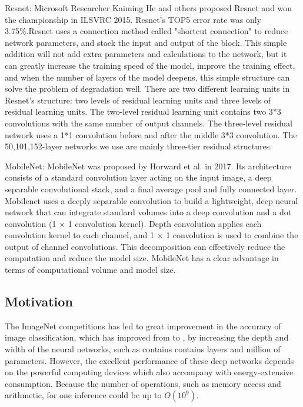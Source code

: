 Resnet: Microsoft Researcher Kaiming He and others proposed Resnet and won the championship in ILSVRC 2015. Resnet's TOP5 error rate was only 3.75\%.Resnet uses a connection method called "shortcut connection" to reduce network parameters, and stack the input and output of the block. This simple addition will not add extra parameters and calculations to the network, but it can greatly increase the training speed of the model, improve the training effect, and when the number of layers of the model deepens, this simple structure can solve the problem of degradation well. There are two different learning units in Resnet's structure: two levels of residual learning units and three levels of residual learning units. The two-level residual learning unit contains two 3*3 convolutions with the same number of output channels. The three-level residual network uses a 1*1 convolution before and after the middle 3*3 convolution. The 50,101,152-layer networks we use are mainly three-tier residual structures.


MobileNet: MobileNet was proposed by Horward et al. in 2017. Its architecture consists of a standard convolution layer acting on the input image, a deep separable convolutional stack, and a final average pool and fully connected layer. Mobilenet uses a deeply separable convolution to build a lightweight, deep neural network that can integrate standard volumes into a deep convolution and a dot convolution (1 × 1 convolution kernel). Depth convolution applies each convolution kernel to each channel, and 1 × 1 convolution is used to combine the output of channel convolutions. This decomposition can effectively reduce the computation and reduce the model size. MobileNet has a clear advantage in terms of computational volume and model size.

\subsection{Motivation}
The ImageNet\FIXME{\cite{}} competitions has led to great improvement 
in the accuracy of image classification,
which has improved from \FIXME{\cite{}} to \FIXME{\cite{}},
by increasing the depth and width of the neural networks,
such as  contains contains  layers and
 million of parameters.
However, the excellent performance of these deep networks 
depends on the powerful computing devices which also accompany with
energy-extensive consumption.
Because the number of operations, such as memory access and arithmetic,
for one inference could be up to $O(10^9)$.


